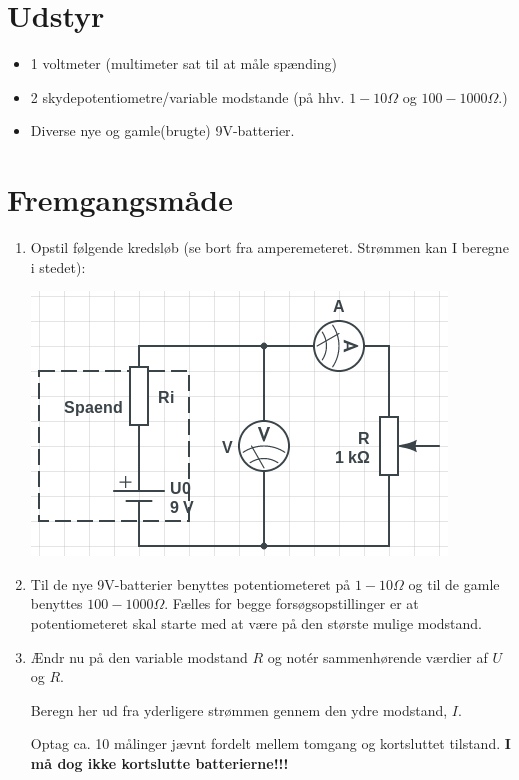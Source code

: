 \documentclass[a4paper, 12pt]{article}
\begin{document}
\section*{Udstyr}
\label{sec:orgaf0e26f}
\begin{itemize}
\item 1 voltmeter (multimeter sat til at måle spænding)
\item 2 skydepotentiometre/variable modstande (på hhv. \(1-10 \Omega\) og \(100-1000 \Omega\).)
\item Diverse nye og gamle(brugte) 9V-batterier.
\end{itemize}

\section*{Fremgangsmåde}
\label{sec:org30d2f47}
\begin{enumerate}
\item Opstil følgende kredsløb (se bort fra amperemeteret. Strømmen kan I beregne i stedet):

\begin{center}
\includegraphics[width=.9\linewidth]{./img/kredsloeb.png}
\end{center}

\item Til de nye 9V-batterier benyttes potentiometeret på \(1-10 \Omega\) og til de gamle benyttes \(100-1000 \Omega\). Fælles for begge forsøgsopstillinger er at potentiometeret skal starte med at være på den største mulige modstand.

\item Ændr nu på den variable modstand \(R\) og notér sammenhørende værdier af \(U\) og \(R\).

Beregn her ud fra yderligere strømmen gennem den ydre modstand, \(I\).

Optag ca. 10 målinger jævnt fordelt mellem tomgang og kortsluttet tilstand. \textbf{I må dog ikke kortslutte batterierne!!!}
\end{enumerate}
\end{document}
